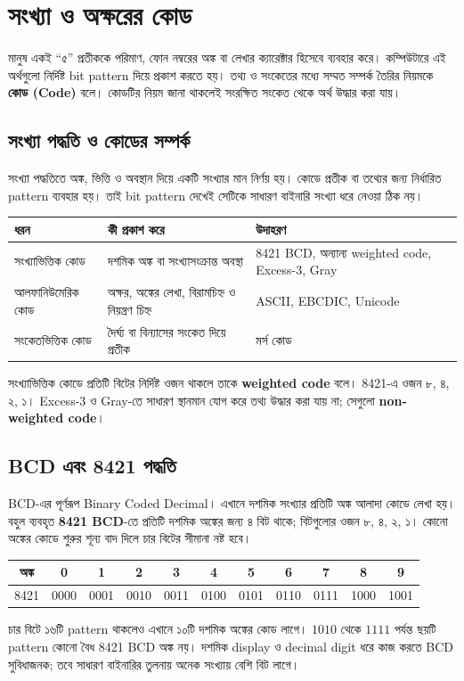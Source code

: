 \section{সংখ্যা ও অক্ষরের কোড}
মানুষ একই ``৫'' প্রতীককে পরিমাণ, ফোন নম্বরের অঙ্ক বা লেখার ক্যারেক্টার হিসেবে ব্যবহার করে। কম্পিউটারে এই অর্থগুলো নির্দিষ্ট bit pattern দিয়ে প্রকাশ করতে হয়। তথ্য ও সংকেতের মধ্যে সম্মত সম্পর্ক তৈরির নিয়মকে \textbf{কোড (Code)} বলে। কোডটির নিয়ম জানা থাকলেই সংরক্ষিত সংকেত থেকে অর্থ উদ্ধার করা যায়।

\subsection{সংখ্যা পদ্ধতি ও কোডের সম্পর্ক}
সংখ্যা পদ্ধতিতে অঙ্ক, ভিত্তি ও অবস্থান দিয়ে একটি সংখ্যার মান নির্ণয় হয়। কোডে প্রতীক বা তথ্যের জন্য নির্ধারিত pattern ব্যবহার হয়। তাই bit pattern দেখেই সেটিকে সাধারণ বাইনারি সংখ্যা ধরে নেওয়া ঠিক নয়।
\begin{center}\begin{tabularx}{\linewidth}{|L{.23\linewidth}|Y|Y|}\hline
{}ধরন&কী প্রকাশ করে&উদাহরণ\\\hline
সংখ্যাভিত্তিক কোড&দশমিক অঙ্ক বা সংখ্যাসংক্রান্ত অবস্থা&8421 BCD, অন্যান্য weighted code, Excess-3, Gray\\\hline
আলফানিউমেরিক কোড&অক্ষর, অঙ্কের লেখা, বিরামচিহ্ন ও নিয়ন্ত্রণ চিহ্ন&ASCII, EBCDIC, Unicode\\\hline
সংকেতভিত্তিক কোড&দৈর্ঘ্য বা বিন্যাসের সংকেত দিয়ে প্রতীক&মর্স কোড\\\hline
\end{tabularx}\end{center}
সংখ্যাভিত্তিক কোডে প্রতিটি বিটের নির্দিষ্ট ওজন থাকলে তাকে \textbf{weighted code} বলে। 8421-এ ওজন ৮, ৪, ২, ১। Excess-3 ও Gray-তে সাধারণ স্থানমান যোগ করে তথ্য উদ্ধার করা যায় না; সেগুলো \textbf{non-weighted code}।

\subsection{BCD এবং 8421 পদ্ধতি}
BCD-এর পূর্ণরূপ \textenglish{Binary Coded Decimal}। এখানে দশমিক সংখ্যার প্রতিটি অঙ্ক আলাদা কোডে লেখা হয়। বহুল ব্যবহৃত \textbf{8421 BCD}-তে প্রতিটি দশমিক অঙ্কের জন্য ৪ বিট থাকে; বিটগুলোর ওজন ৮, ৪, ২, ১। কোনো অঙ্কের কোডে শুরুর শূন্য বাদ দিলে চার বিটের সীমানা নষ্ট হবে।
\begin{center}\begin{tabular}{|c|c|c|c|c|c|c|c|c|c|c|}\hline
অঙ্ক&0&1&2&3&4&5&6&7&8&9\\\hline
8421&0000&0001&0010&0011&0100&0101&0110&0111&1000&1001\\\hline
\end{tabular}\end{center}
চার বিটে ১৬টি pattern থাকলেও এখানে ১০টি দশমিক অঙ্কের কোড লাগে। $1010$ থেকে $1111$ পর্যন্ত ছয়টি pattern কোনো বৈধ 8421 BCD অঙ্ক নয়। দশমিক display ও decimal digit ধরে কাজ করতে BCD সুবিধাজনক; তবে সাধারণ বাইনারির তুলনায় অনেক সংখ্যায় বেশি বিট লাগে।

